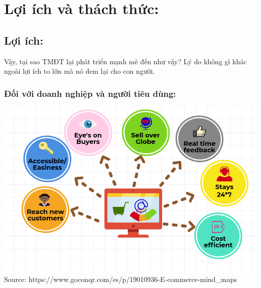 \documentclass[13pt,a4paper]{article}
\begin{document}
\section{Lợi ích và thách thức:}
\subsection{Lợi ích:}
Vậy, tại sao TMĐT lại phát triển mạnh mẽ đến như vậy? Lý do không gì khác ngoài lợi ích to lớn mà nó đem lại cho con người.
\subsubsection{Đối với doanh nghiệp và người tiêu dùng:}
\begin{center}
\includegraphics[scale=0.4]{images/bene1.png}\\
\fontsize{10pt}{1.2pt}\selectfont
    Source: https://www.goconqr.com/es/p/19010936-E-commerce-mind\_maps
\end{center}
\end{document}
